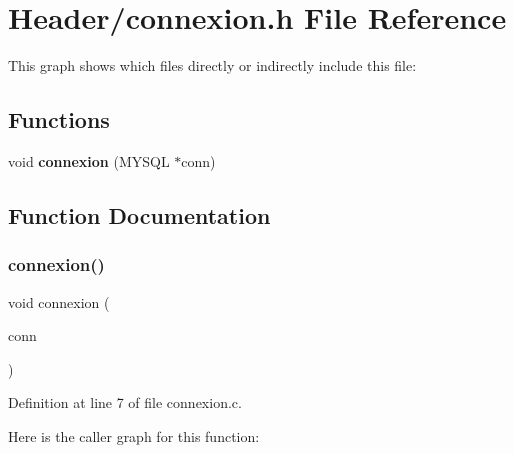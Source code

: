 \section{Header/connexion.h File Reference}
\label{connexion_8h}
This graph shows which files directly or indirectly include this file\+:
\subsection*{Functions}
\begin{DoxyCompactItemize}
\item 
void \textbf{ connexion} (M\+Y\+S\+QL $\ast$conn)
\end{DoxyCompactItemize}


\subsection{Function Documentation}
\mbox{\label{connexion_8h_a9d9a95cb3f145d625490698dc9a36981}} 
\subsubsection{connexion()}
{\footnotesize\ttfamily void connexion (\begin{DoxyParamCaption}\item[{M\+Y\+S\+QL $\ast$}]{conn }\end{DoxyParamCaption})}



Definition at line 7 of file connexion.\+c.

Here is the caller graph for this function\+:
